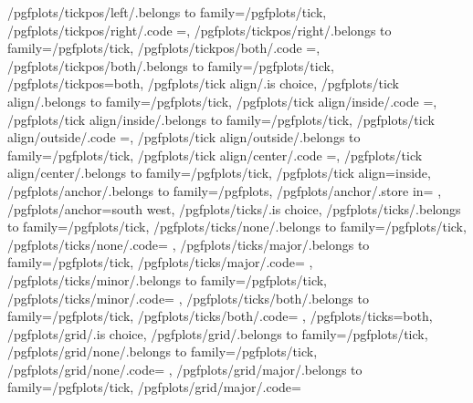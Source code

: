 {	/pgfplots/tickpos/left/.belongs to family=/pgfplots/tick,
	/pgfplots/tickpos/right/.code	={\def\pgfplots@xtickposnum{3}\def\pgfplots@ytickposnum{3}},
	/pgfplots/tickpos/right/.belongs to family=/pgfplots/tick,
	/pgfplots/tickpos/both/.code	={\def\pgfplots@xtickposnum{0}\def\pgfplots@ytickposnum{0}},
	/pgfplots/tickpos/both/.belongs to family=/pgfplots/tick,
	/pgfplots/tickpos=both,
	/pgfplots/tick align/.is choice,
	/pgfplots/tick align/.belongs to family=/pgfplots/tick,
	/pgfplots/tick align/inside/.code	={\def\pgfplots@xtickalignnum{0}\def\pgfplots@ytickalignnum{0}},
	/pgfplots/tick align/inside/.belongs to family=/pgfplots/tick,
	/pgfplots/tick align/outside/.code	={\def\pgfplots@xtickalignnum{1}\def\pgfplots@ytickalignnum{1}},
	/pgfplots/tick align/outside/.belongs to family=/pgfplots/tick,
	/pgfplots/tick align/center/.code	={\def\pgfplots@xtickalignnum{2}\def\pgfplots@ytickalignnum{2}},
	/pgfplots/tick align/center/.belongs to family=/pgfplots/tick,
	/pgfplots/tick align=inside,
	/pgfplots/anchor/.belongs to family=/pgfplots,
	/pgfplots/anchor/.store in=			\pgfplots@anchorname,
	/pgfplots/anchor=south west,
	/pgfplots/ticks/.is choice,
	/pgfplots/ticks/.belongs to family=/pgfplots/tick,
	/pgfplots/ticks/none/.belongs to family=/pgfplots/tick,
	/pgfplots/ticks/none/.code={%
		\pgfplots@xminorticksfalse
		\pgfplots@yminorticksfalse
		\pgfplots@xmajorticksfalse
		\pgfplots@ymajorticksfalse
	},
	/pgfplots/ticks/major/.belongs to family=/pgfplots/tick,
	/pgfplots/ticks/major/.code={%
		\pgfplots@xminorticksfalse
		\pgfplots@yminorticksfalse
		\pgfplots@xmajortickstrue
		\pgfplots@ymajortickstrue
	},
	/pgfplots/ticks/minor/.belongs to family=/pgfplots/tick,
	/pgfplots/ticks/minor/.code={%
		\pgfplots@xminortickstrue
		\pgfplots@yminortickstrue
		\pgfplots@xmajorticksfalse
		\pgfplots@ymajorticksfalse
	},
	/pgfplots/ticks/both/.belongs to family=/pgfplots/tick,
	/pgfplots/ticks/both/.code={%
		\pgfplots@xminortickstrue
		\pgfplots@yminortickstrue
		\pgfplots@xmajortickstrue
		\pgfplots@ymajortickstrue
	},
	/pgfplots/ticks=both,
	/pgfplots/grid/.is choice,
	/pgfplots/grid/.belongs to family=/pgfplots/tick,
	/pgfplots/grid/none/.belongs to family=/pgfplots/tick,
	/pgfplots/grid/none/.code={%
		\pgfplots@xminorgridsfalse
		\pgfplots@yminorgridsfalse
		\pgfplots@xmajorgridsfalse
		\pgfplots@ymajorgridsfalse
	},
	/pgfplots/grid/major/.belongs to family=/pgfplots/tick,
	/pgfplots/grid/major/.code={%
		\pgfplots@xminorgridsfalse
		\pgfplots@yminorgridsfalse
}}
